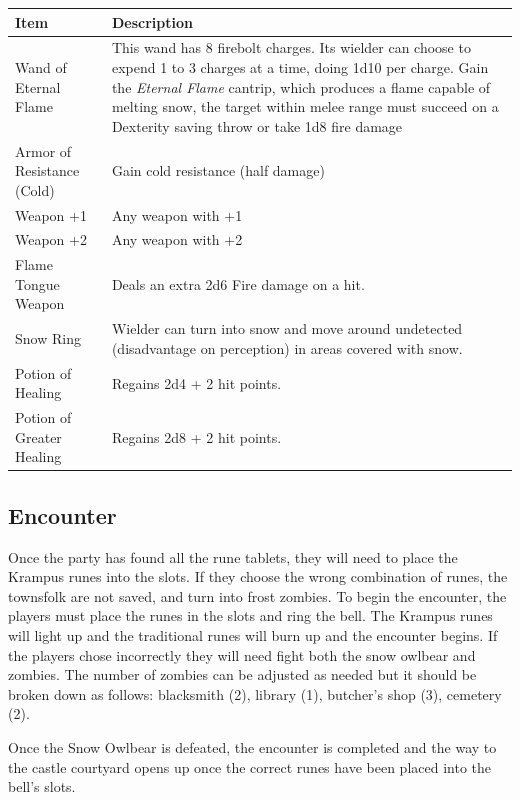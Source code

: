 \documentclass{article}
\begin{document}
\begin{multicols*}{2}
	\begin{table}[H]
		\begin{tabular}{|m{7.5em}|m{15em}|}
			\hline
			\textbf{Item} & \textbf{Description} \\
			\hline
			\hline
			Wand of Eternal Flame & This wand has 8 firebolt charges. Its wielder can choose to expend 1 to 3 charges at a time, doing 1d10 per charge. Gain the \emph{Eternal Flame} cantrip, which produces a flame capable of melting snow, the target within melee range must succeed on a Dexterity saving throw or take 1d8 fire damage \\ 
			\hline
			Armor of Resistance (Cold) & Gain cold resistance (half damage)  \\
			\hline
			Weapon +1 & Any weapon with +1 \\
			\hline
			Weapon +2 & Any weapon with +2 \\
			\hline
			Flame Tongue Weapon & Deals an extra 2d6 Fire damage on a hit.  \\ 
			\hline
			Snow Ring & Wielder can turn into snow and move around undetected (disadvantage on perception) in areas covered with snow. \\
			\hline
			Potion of Healing & Regains 2d4 + 2 hit points. \\
			\hline
			Potion of Greater Healing & Regains 2d8 + 2 hit points. \\
			\hline
		\end{tabular}
	\end{table}


\subsection*{Encounter}
Once the party has found all the rune tablets, they will need to place the Krampus runes into the slots. If they choose the wrong combination of runes, the townsfolk are not saved, and turn into frost zombies. To begin the encounter, the players must place the runes in the slots and ring the bell. The Krampus runes will light up and the traditional runes will burn up and the encounter begins. If the players chose incorrectly they will need fight both the snow owlbear and zombies. The number of zombies can be adjusted as needed but it should be broken down as follows: blacksmith (2), library (1), butcher's shop (3), cemetery (2).




Once the Snow Owlbear is defeated, the encounter is completed and the way to the castle courtyard opens up once the correct runes have been placed into the bell's slots.


\end{multicols*}
\end{document}
